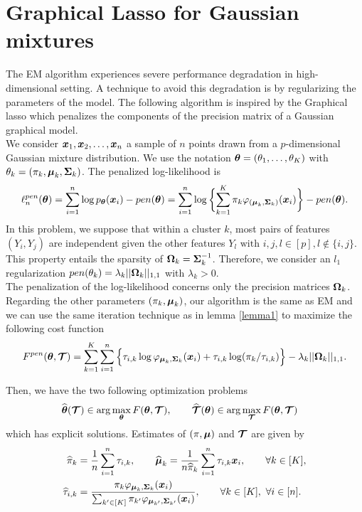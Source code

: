 \section{Graphical Lasso for Gaussian mixtures}

The EM algorithm experiences severe performance degradation in high-dimensional setting. A technique to avoid this degradation is by regularizing the parameters of the model. The following algorithm is inspired by the Graphical lasso \citep{glasso07} \citep{banerjee} which penalizes the components of the precision matrix of a Gaussian graphical model.\\

We consider $\boldsymbol x_1,\boldsymbol x_2,\dots,\boldsymbol x_n$ a sample of $n$ points drawn from a $p$-dimensional Gaussian mixture distribution. We use the notation ${\boldsymbol\theta}=(\theta_1,\dots,\theta_K)$ with $\theta_k=(\pi_k, \boldsymbol\mu_k, \boldsymbol\Sigma_k)$. The penalized log-likelihood is
\begin{equation}\label{pen-log-likelihood}
\ell_n^{pen}({\boldsymbol\theta})=\sum_{i=1}^{n}\log{p_{{\boldsymbol\theta}}(\boldsymbol x_i)}-pen({\boldsymbol\theta})=
\sum_{i=1}^{n}\log\bigg\{{\sum_{k=1}^K\pi_k\varphi_{(\boldsymbol\mu_{k},\boldsymbol\Sigma_{k})}(\boldsymbol x_i)}\bigg\} -pen({\boldsymbol\theta}).
\end{equation}
In this problem, we suppose that within a cluster $k$, most pairs of features $(Y_i,Y_j)$ are independent given the other features $Y_l \text{ with } i,j,l\in[p], l\notin\{i,j \}$. This property entails the sparsity of $\boldsymbol\Omega_k=\boldsymbol\Sigma_k^{-1}$. 
Therefore, we consider an $l_1$ regularization $pen(\theta_k)=\lambda_k||\boldsymbol\Omega_k||_{1,1}$ with $\lambda_k>0$.\\

The penalization of the log-likelihood concerns only the precision matrices $\boldsymbol\Omega_k$. Regarding the other parameters $(\pi_k, \boldsymbol\mu_k)$, our algorithm is the same as EM and we can use the same iteration technique as in lemma \ref{lemma1} to maximize the following cost function
\begin{equation}
\label{cost_fun_pen}
F^{pen}({\boldsymbol\theta},\boldsymbol{\mathcal T})  = \sum_{k=1}^K \sum_{i=1}^{n} \Big\{\tau_{i,k}\log\varphi_{\boldsymbol\mu_{k},\boldsymbol\Sigma_{k}}(\boldsymbol x_i)+\tau_{i,k}
    \log(\pi_k/\tau_{i,k})\Big\}-\lambda_k||\boldsymbol\Omega_k||_{1,1}.
\end{equation}

Then, we have the two following optimization problems
\begin{align}
\widehat{{\boldsymbol\theta}}(\boldsymbol{\mathcal T})&\in \arg\max_{{\boldsymbol\theta}} F({\boldsymbol\theta},\boldsymbol{\mathcal T}),\qquad \widehat{\boldsymbol{\mathcal T}}({\boldsymbol\theta})\in \arg\max_{\boldsymbol{\mathcal T}} F({\boldsymbol\theta},\boldsymbol{\mathcal T})
\end{align}
which has explicit solutions. Estimates of $(\pi,\boldsymbol\mu)$ and $\boldsymbol{\mathcal T}$ are given by
\begin{align}
\label{em-sols}
\widehat\pi_k     &= \frac1n\sum_{i=1}^n \tau_{i,k},\qquad\widehat{\boldsymbol\mu}_k = \frac1{n\widehat\pi_k}\sum_{i=1}^n \tau_{i,k}\boldsymbol x_i ,\qquad \forall k\in[K],\\
\label{em-sols-tau}
\widehat\tau_{i,k}&= \frac{\pi_k\varphi_{\boldsymbol\mu_k,\boldsymbol\Sigma_k}(\boldsymbol x_i)}{\sum_{k'\in[K]}\pi_{k'}\varphi_{\boldsymbol\mu_{k'},\boldsymbol\Sigma_{k'}}(\boldsymbol x_i)},\qquad\forall k\in[K],\ \forall i\in[n].
\end{align}

